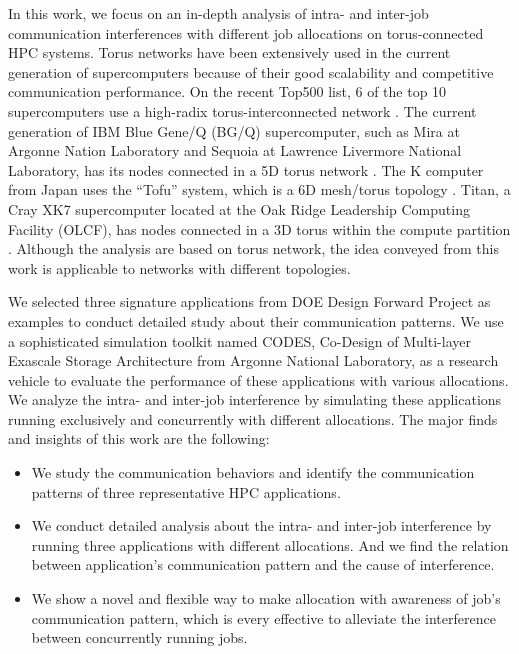 \documentclass[conference]{IEEEtran}
\begin{document}
In this work, we focus on an in-depth analysis of intra- and inter-job communication interferences with  different job allocations on torus-connected HPC systems. Torus networks have been extensively used in the current generation of supercomputers because of their good scalability and competitive communication performance. On the recent Top500 list, 6 of the top 10 supercomputers use a high-radix torus-interconnected network \cite{top500}. The current generation of IBM Blue Gene/Q (BG/Q) supercomputer, such as Mira at Argonne Nation Laboratory and Sequoia at  Lawrence Livermore National Laboratory, has its nodes connected in a 5D torus network \cite{bgq}. The K computer from Japan uses the ``Tofu” system, which is a 6D mesh/torus topology \cite{tofu}. Titan, a Cray XK7 supercomputer located at the Oak Ridge Leadership Computing Facility (OLCF), has nodes connected in a 3D torus within the compute partition \cite{titan}. Although the analysis are based on torus network, the idea conveyed from this work is applicable to networks with different topologies. 

We selected three signature applications from DOE Design Forward Project\cite{designforwardwebpage} as examples to conduct detailed study about their communication patterns. We use a sophisticated simulation toolkit named CODES, Co-Design of Multi-layer Exascale Storage Architecture\cite{Jason-2011} from Argonne National Laboratory, as a research vehicle to evaluate the performance of these applications with various allocations. We analyze the intra- and inter-job interference by simulating these applications running exclusively and concurrently with different allocations. The major finds and insights of this work are the following:

\begin{itemize}
    \item We study the communication behaviors and identify the communication patterns of three representative HPC applications.
    \item We conduct detailed analysis about the intra- and inter-job interference by running three applications with different allocations. And we find the relation between application's communication pattern and the cause of interference.
    \item We show a novel and flexible way to make allocation with awareness of job's communication pattern, which  is every effective to alleviate the interference between concurrently running jobs. 
\end{itemize}
\end{document}
